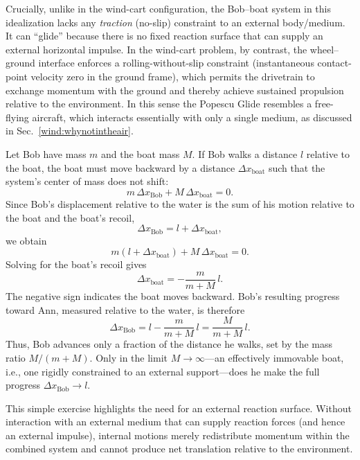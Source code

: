 \documentclass[reprint,aps,pra,longbibliography]{revtex4-2}
\begin{document}
Crucially, unlike in the wind-cart configuration, the Bob--boat system in this
idealization lacks any \emph{traction} (no-slip) constraint to an external
body/medium. It can ``glide'' because there is no fixed reaction surface that
can supply an external horizontal impulse. In the wind-cart problem, by
contrast, the wheel--ground interface enforces a rolling-without-slip
constraint (instantaneous contact-point velocity zero in the ground frame),
which permits the drivetrain to exchange momentum with the ground and thereby
achieve sustained propulsion relative to the environment. In this sense the
Popescu Glide resembles a free-flying aircraft, which interacts essentially
with only a single medium, as discussed in Sec.~\ref{wind:whynotintheair}.

Let Bob have mass $m$ and the boat mass $M$. If Bob walks a distance $l$ relative to the boat, the boat must move backward by a distance $\Delta x_\text{boat}$ such that the system's center of mass does not shift:
\begin{equation}
m\,\Delta x_\text{Bob} + M\,\Delta x_\text{boat} = 0.
\end{equation}
Since Bob's displacement relative to the water is the sum of his motion relative to the boat and the boat's recoil,
\begin{equation}
\Delta x_\text{Bob} = l + \Delta x_\text{boat},
\end{equation}
we obtain
\begin{equation}
m(l + \Delta x_\text{boat}) + M\,\Delta x_\text{boat} = 0.
\end{equation}
Solving for the boat's recoil gives
\begin{equation}
\Delta x_\text{boat} = -\frac{m}{m+M}\,l.
\end{equation}
The negative sign indicates the boat moves backward. Bob's resulting progress toward Ann, measured relative to the water, is therefore
\begin{equation}
\Delta x_\text{Bob} = l - \frac{m}{m+M}\,l = \frac{M}{m+M}\,l.
\end{equation}
Thus, Bob advances only a fraction of the distance he walks, set by the mass ratio \(M/(m+M)\). Only in the limit \(M\to\infty\)---an effectively immovable boat, i.e., one rigidly constrained to an external support---does he make the full progress \(\Delta x_\text{Bob}\to l\).

This simple exercise highlights the need for an external reaction surface. Without interaction with an external medium that can supply reaction forces (and hence an external impulse), internal motions merely redistribute momentum within the combined system and cannot produce net translation relative to the environment.
\end{document}
